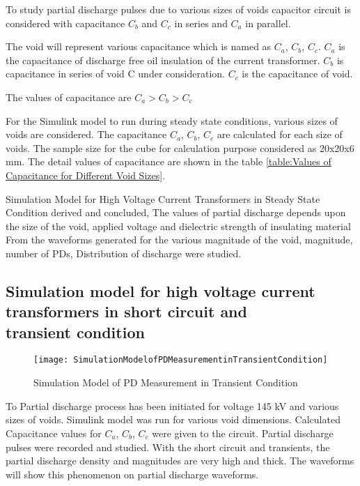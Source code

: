 To study partial discharge pulses due to various sizes of voids capacitor circuit is considered with capacitance $C_b$ and $C_c$ in series and $C_a$ in parallel\setlength{\parskip}{1em}.

The void will represent various capacitance which is named as $C_a$, $C_b$, $C_c$. $C_a$ is the capacitance of discharge free oil insulation of the current transformer. $C_b$ is capacitance in series of void C under consideration. $C_c$ is the capacitance of void.
 
The values of capacitance are $C_a > C_b > C_c$

For the Simulink model to run during steady state conditions, various sizes of voids are considered. The capacitance $C_a$, $C_b$, $C_c$ are calculated for each size of voids. The sample size for the cube for calculation purpose considered as 20x20x6 mm. The detail values of capacitance are shown in the table \ref{table:Values of Capacitance for Different Void Sizes}.

Simulation Model for High Voltage Current Transformers in Steady State Condition derived and concluded, The values of partial discharge depends upon the size of the void, applied voltage and dielectric strength of insulating material From the waveforms generated for the various magnitude of the void, magnitude, number of PDs, Distribution of discharge were studied\setlength{\parskip}{0em}.

\subsection[Simulation model for high voltage current transformers in short circuit and transient condition]{Simulation model for high voltage current\\transformers in short circuit and\\transient condition}

\begin{figure}[h!]
\centering
\texttt{[image: SimulationModelofPDMeasurementinTransientCondition]}
\caption{Simulation Model of PD Measurement in Transient Condition}
\label{fig:Simulation Model of PD Measurement in Transient Condition}
\end{figure}

To Partial discharge process has been initiated for voltage 145 kV and various sizes of voids. Simulink model was run for various void dimensions. Calculated Capacitance values for $C_a$, $C_b$, $C_c$ were given to the circuit. Partial discharge pulses were recorded and studied. With the short circuit and transients, the partial discharge density and magnitudes are very high and thick. The waveforms will show this phenomenon on partial discharge waveforms.

